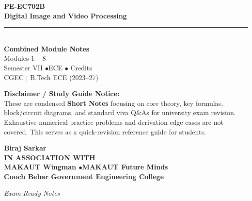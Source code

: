 \documentclass[12pt,a4paper]{article}
\begin{document}
\thispagestyle{empty}


\vspace*{1.0cm}
\begin{center}
  {\Huge\bfseries\color{myred} PE-EC702B}\\[10pt]
  {\LARGE\bfseries\color{mydark} Digital Image and Video Processing}\\[20pt]
  {\color{myred}\rule{0.7\linewidth}{1.5pt}}\\[18pt]
  {\Large\color{myteal}\textbf{Combined Module Notes}}\\[8pt]
  {\large\color{mydark} Modules 1 -- 8}\\[40pt]
  {\normalsize\color{mydark} Semester VII \quad$\bullet$\quad ECE \quad$\bullet$ Credits}\\[12pt]
  {\normalsize\color{mydark} CGEC \;$|$\; B.Tech ECE (2023--27)}
\end{center}
\vspace{1.0cm}
\begin{center}
  \begin{tcolorbox}[colback=mygray, colframe=mgframe, boxrule=0.5pt, arc=3pt, width=0.85\linewidth]
    \centering\small\color{mydark}
    \textbf{Disclaimer / Study Guide Notice:}\\
    These are condensed \textbf{Short Notes} focusing on core theory, key formulas, block/circuit diagrams, and standard viva Q\&As for university exam revision. Exhaustive numerical practice problems and derivation edge cases are not covered. This serves as a quick-revision reference guide for students.
  \end{tcolorbox}
\end{center}
\vfill
\vspace{0.6cm}
\begin{center}
  {\large\bfseries\color{mypurple} Biraj Sarkar}\\[16pt]
  {\footnotesize\color{watermark}\textbf{IN ASSOCIATION WITH}}\\[8pt]
  {\small\bfseries\color{mydark} MAKAUT Wingman \quad$\bullet$\quad MAKAUT Future Minds}\\[12pt]
  {\large\bfseries\color{myteal} Cooch Behar Government Engineering College}
\end{center}
\vfill
\begin{center}{\small\color{watermark}\textit{Exam-Ready Notes}}\end{center}
\clearpage
\end{document}
